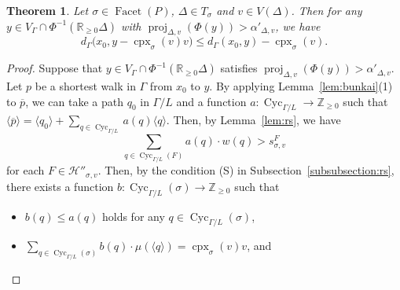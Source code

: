 \documentclass[11pt]{article}
\newtheorem{thm}[theo]{Theorem}
\theoremstyle{definition}
\numberwithin{equation}{section}
\begin{document}
\begin{thm}\label{thm:gen}
Let $\sigma \in \operatorname{Facet}(P)$, $\Delta \in T_{\sigma}$ and $v \in V(\Delta)$. 
Then for any $y \in V_{\Gamma} \cap \Phi ^{-1}(\mathbb{R}_{\ge 0} \Delta)$ with $\operatorname{proj}_{\Delta, v} (\Phi(y)) > \alpha ' _{\Delta, v}$, we have  
\[
d_{\Gamma}\bigl( x_0, y - \operatorname{cpx}_{\sigma}(v)v \bigr) 
\le d_{\Gamma}( x_0, y) - \operatorname{cpx}_{\sigma}(v). 
\]
\end{thm}
\begin{proof}
Suppose that $y \in V_{\Gamma} \cap \Phi ^{-1}(\mathbb{R}_{\ge 0} \Delta)$ satisfies $\operatorname{proj}_{\Delta, v} (\Phi(y)) > \alpha' _{\Delta, v}$. 
Let $p$ be a shortest walk in $\Gamma$ from $x_0$ to $y$. 
By applying Lemma~\ref{lem:bunkai}(1) to $\overline{p}$, 
we can take a path $q_0$ in $\Gamma /L$ and a function $a : \operatorname{Cyc}_{\Gamma /L} \to \mathbb{Z}_{\ge 0}$ 
such that $\langle \overline{p} \rangle = \langle q_0 \rangle + \sum _{q \in \operatorname{Cyc}_{\Gamma /L}} a(q) \langle q \rangle$. 
Then, by Lemma~\ref{lem:rs}, we have 
\[
\sum _{q \in \operatorname{Cyc}_{\Gamma /L}(F)} a(q) \cdot w(q) > s^{F} _{\sigma, v}
\]
for each $F \in \mathcal{H}'' _{\sigma, v}$. 
Then, by the condition (S) in Subsection~\ref{subsubsection:rs}, 
there exists a function $b: \operatorname{Cyc}_{\Gamma /L}(\sigma) \to \mathbb{Z}_{\ge 0}$ such that 
\begin{itemize}
\item 
$b(q) \le a(q)$ holds for any $q \in \operatorname{Cyc}_{\Gamma /L}(\sigma)$, 

\item 
$\sum _{q \in \operatorname{Cyc}_{\Gamma /L}(\sigma)} b(q) \cdot \mu(\langle q \rangle) = \operatorname{cpx}_{\sigma}(v) v$, and 


\end{itemize}
\end{proof}
\end{document}
